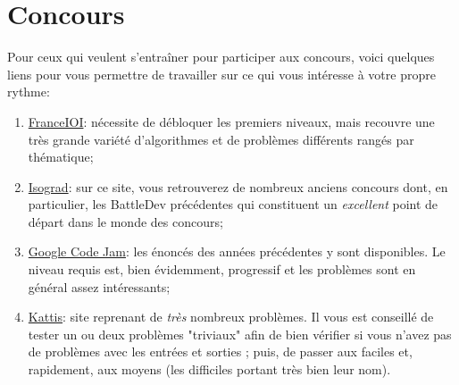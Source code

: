 \documentclass[a4paper]{article}
\begin{document}
\section{Concours}
Pour ceux qui veulent s'entraîner pour participer aux concours, voici quelques liens pour vous permettre de travailler sur ce qui vous intéresse à votre propre rythme:\\
\begin{enumerate}
\item \href{http://www.france-ioi.org/algo/chapters.php}{FranceIOI}: nécessite de débloquer les premiers niveaux, mais recouvre une très grande variété d'algorithmes et de problèmes différents rangés par thématique;
\item \href{https://www.isograd.com/FR/solutionconcours.php?contest_id=46&que_str_id=&reg_typ_id=2&fbclid=IwAR3A3eAVzJVquecv1_MaLoWCMhLxku8SxbQl_awOcJcDevuJQ2HZtNHmupg}{Isograd}: sur ce site, vous retrouverez de nombreux anciens concours dont, en particulier, les BattleDev précédentes qui constituent un \emph{excellent} point de départ dans le monde des concours;
\item \href{https://codingcompetitions.withgoogle.com/codejam?fbclid=IwAR1gU6uObu-gYzAOAdsR4uvmBvfhImyiSUi1pMxEEXkPVFA6MTnWVZ1etT0}{Google Code Jam}: les énoncés des années précédentes y sont disponibles. Le niveau requis est, bien évidemment, progressif et les problèmes sont en général assez intéressants;
\item \href{https://open.kattis.com/}{Kattis}: site reprenant de \emph{très} nombreux problèmes. Il vous est conseillé de tester un ou deux problèmes "triviaux" afin de bien vérifier si vous n'avez pas de problèmes avec les entrées et sorties ; puis, de passer aux faciles et, rapidement, aux moyens (les difficiles portant très bien leur nom).
\end{enumerate}
\end{document}
